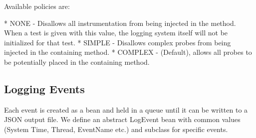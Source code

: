 Available policies are:

* NONE - Disallows all instrumentation from being injected in the method. When a test is given with this value, the logging system itself will not be initialized for that test.
* SIMPLE - Disallows complex probes from being injected in the containing method.
* COMPLEX - (Default), allows all probes to be potentially placed in the containing method.

\subsection{Logging Events}

Each event is created as a bean and held in a queue until it can be written to a JSON output file. We define an abstract LogEvent bean with common values (System Time, Thread, EventName etc.) and subclass for specific events.

